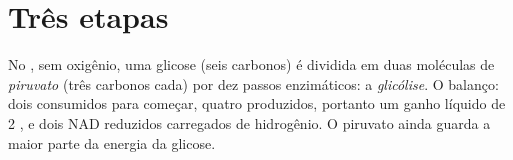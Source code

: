\section{Três etapas}

\begin{proposition}[A glicólise]\label{prop:g12:respiration-fermentation:glycolysis}
No , sem oxigênio, uma glicose (seis carbonos) é dividida em
duas moléculas de \emph{piruvato} (três carbonos cada) por dez passos
enzimáticos: a \emph{glicólise}. O balanço: dois 
consumidos para começar, quatro produzidos, portanto um ganho líquido
de 2 , e dois NAD reduzidos carregados de hidrogênio. O piruvato
ainda guarda a maior parte da energia da glicose.
\end{proposition}
\admitted

